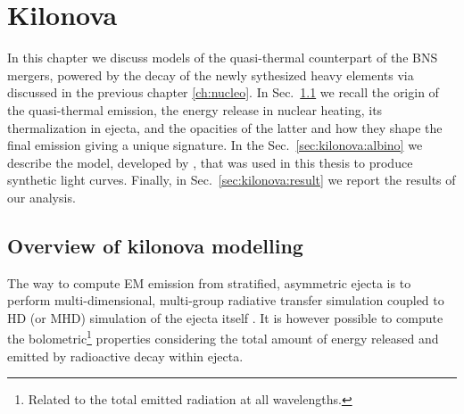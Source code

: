
\chapter{Kilonova} \label{ch:kilonova} 

In this chapter we discuss models of the quasi-thermal counterpart 
of the \ac{BNS} mergers, powered by the decay of the newly sythesized heavy 
elements via \rproc{} \nuc{} discussed in the previous chapter \ref{ch:nucleo}.
%
In Sec.~\ref{sec:intro:kilonova} we recall the origin of the quasi-thermal emission, 
the energy release in nuclear heating, its thermalization in ejecta, and the 
opacities of the latter and how they shape the final emission giving a unique 
signature. 
%
In the Sec.~\ref{sec:kilonova:albino} we describe the model, 
developed by \cite{Perego:2017wtu}, that was used in this thesis to 
produce synthetic light curves. Finally, in Sec.~\ref{sec:kilonova:result} 
we report the results of our analysis.





\section{Overview of kilonova modelling} \label{sec:intro:kilonova}

The way to compute \ac{EM} emission from stratified, asymmetric ejecta is to perform 
multi-dimensional, multi-group radiative transfer simulation coupled to \ac{HD} (or \ac{MHD}) 
simulation of the ejecta itself \citep[\eg][]{Bulla:2019muo}.
%
It is however possible to compute the bolometric\footnote{
    Related to the total emitted radiation at all wavelengths. 
} properties considering the total amount 
of energy released and emitted by radioactive decay within ejecta. 

